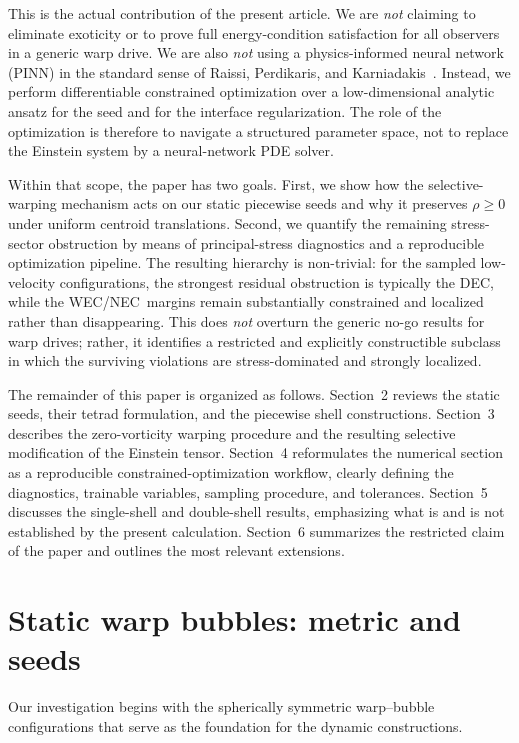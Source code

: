 \documentclass[11pt]{article}
\makeatletter
\newcommand{\@abbr}[1]{\ifmmode\mathrm{#1}\else\textsc{#1}\fi}
\newcommand{\WEC}{\@abbr{WEC}}
\newcommand{\NEC}{\@abbr{NEC}}
\newcommand{\DEC}{\@abbr{DEC}}
\makeatother
\begin{document}
This is the actual contribution of the present article. We are \emph{not} claiming to eliminate exoticity or to prove full energy-condition satisfaction for all observers in a generic warp drive. We are also \emph{not} using a physics-informed neural network (PINN) in the standard sense of Raissi, Perdikaris, and Karniadakis~\cite{Raissi:2019PINN}. Instead, we perform differentiable constrained optimization over a low-dimensional analytic ansatz for the seed and for the interface regularization. The role of the optimization is therefore to navigate a structured parameter space, not to replace the Einstein system by a neural-network PDE solver.

Within that scope, the paper has two goals. First, we show how the selective-warping mechanism acts on our static piecewise seeds and why it preserves $\rho\ge 0$ under uniform centroid translations. Second, we quantify the remaining stress-sector obstruction by means of principal-stress diagnostics and a reproducible optimization pipeline. The resulting hierarchy is non-trivial: for the sampled low-velocity configurations, the strongest residual obstruction is typically the \DEC, while the \WEC/\NEC\ margins remain substantially constrained and localized rather than disappearing. This does \emph{not} overturn the generic no-go results for warp drives; rather, it identifies a restricted and explicitly constructible subclass in which the surviving violations are stress-dominated and strongly localized.

The remainder of this paper is organized as follows. Section~2 reviews the static seeds, their tetrad formulation, and the piecewise shell constructions. Section~3 describes the zero-vorticity warping procedure and the resulting selective modification of the Einstein tensor. Section~4 reformulates the numerical section as a reproducible constrained-optimization workflow, clearly defining the diagnostics, trainable variables, sampling procedure, and tolerances. Section~5 discusses the single-shell and double-shell results, emphasizing what is and is not established by the present calculation. Section~6 summarizes the restricted claim of the paper and outlines the most relevant extensions.


\section{Static warp bubbles: metric and seeds}
\label{sec:static}
Our investigation begins with the spherically symmetric warp--bubble configurations that serve as the foundation for the dynamic constructions.
\end{document}
